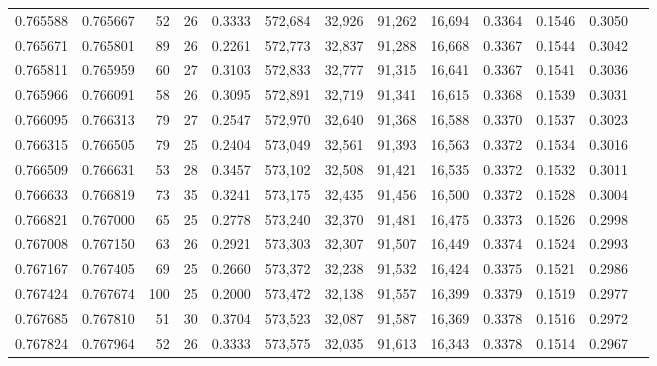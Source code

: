 \begin{tabular}{rrrrrrrrrrrrr}
0.765588 & 0.765667 &    52 &  26 &                                     0.3333 & 572,684 &  32,926 &  91,262 &  16,694 & 0.3364 & 0.1546 & 0.3050 \\
0.765671 & 0.765801 &    89 &  26 &                                     0.2261 & 572,773 &  32,837 &  91,288 &  16,668 & 0.3367 & 0.1544 & 0.3042 \\
0.765811 & 0.765959 &    60 &  27 &                                     0.3103 & 572,833 &  32,777 &  91,315 &  16,641 & 0.3367 & 0.1541 & 0.3036 \\
0.765966 & 0.766091 &    58 &  26 &                                     0.3095 & 572,891 &  32,719 &  91,341 &  16,615 & 0.3368 & 0.1539 & 0.3031 \\
0.766095 & 0.766313 &    79 &  27 &                                     0.2547 & 572,970 &  32,640 &  91,368 &  16,588 & 0.3370 & 0.1537 & 0.3023 \\
0.766315 & 0.766505 &    79 &  25 &                                     0.2404 & 573,049 &  32,561 &  91,393 &  16,563 & 0.3372 & 0.1534 & 0.3016 \\
0.766509 & 0.766631 &    53 &  28 &                                     0.3457 & 573,102 &  32,508 &  91,421 &  16,535 & 0.3372 & 0.1532 & 0.3011 \\
0.766633 & 0.766819 &    73 &  35 &                                     0.3241 & 573,175 &  32,435 &  91,456 &  16,500 & 0.3372 & 0.1528 & 0.3004 \\
0.766821 & 0.767000 &    65 &  25 &                                     0.2778 & 573,240 &  32,370 &  91,481 &  16,475 & 0.3373 & 0.1526 & 0.2998 \\
0.767008 & 0.767150 &    63 &  26 &                                     0.2921 & 573,303 &  32,307 &  91,507 &  16,449 & 0.3374 & 0.1524 & 0.2993 \\
0.767167 & 0.767405 &    69 &  25 &                                     0.2660 & 573,372 &  32,238 &  91,532 &  16,424 & 0.3375 & 0.1521 & 0.2986 \\
0.767424 & 0.767674 &   100 &  25 &                                     0.2000 & 573,472 &  32,138 &  91,557 &  16,399 & 0.3379 & 0.1519 & 0.2977 \\
0.767685 & 0.767810 &    51 &  30 &                                     0.3704 & 573,523 &  32,087 &  91,587 &  16,369 & 0.3378 & 0.1516 & 0.2972 \\
0.767824 & 0.767964 &    52 &  26 &                                     0.3333 & 573,575 &  32,035 &  91,613 &  16,343 & 0.3378 & 0.1514 & 0.2967 \\

\end{tabular}
